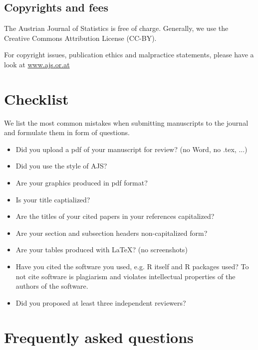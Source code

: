 \documentclass[article]{ajs}
\begin{document}
\subsection{Copyrights and fees}

The Austrian Journal of Statistics is free of
charge. Generally, we use the Creative Commons Attribution License (CC-BY).

For copyright issues, publication ethics and malpractice statements, please have a look at 
\href{www.ajs.or.at}{www.ajs.or.at}


\section{Checklist}

We list the most common mistakes when submitting manuscripts to the journal and formulate them in form of questions.

\begin{itemize}
\item Did you upload a pdf of your manuscript for review? (no Word, no .tex, ...)
\item Did you use the style of AJS?  
\item Are your graphics produced in pdf format? 
\item Is your title captialized?
\item Are the titles of your cited papers in your references capitalized?
\item Are your section and subsection headers non-capitalized form?
\item Are your tables produced with \LaTeX ? (no screenshots)
\item Have you cited the software you used, e.g. R itself and R packages used? To not cite software is plagiarism and violates intellectual properties of the authors of the software.
\item Did you proposed at least three independent reviewers?
\end{itemize}

\section{Frequently asked questions}
\end{document}
